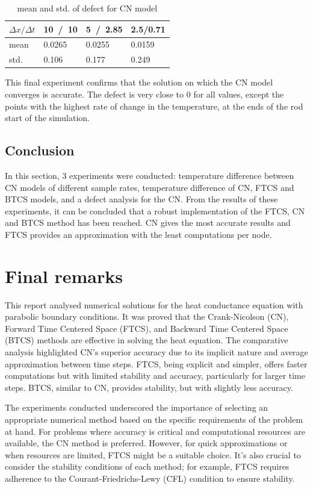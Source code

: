 \documentclass[a4paper]{article} %
\begin{document}
\begin{table}[H]
\centering
\small
\begin{tabular}{ |p{1.2cm}||p{1.2cm}|p{1.2cm}|p{1.2cm}| }
 \hline
 \rowcolor{gray!50}
 $\Delta x / \Delta t$ & 10\ /\ 10 & 5\ /\ 2.85 &  2.5/0.71 \\
 \hline 
 \cellcolor{gray!25} mean & 0.0265 & 0.0255 & 0.0159 \\
 \hline
 \cellcolor{gray!25} std. & 0.106 & 0.177 & 0.249 \\
 \hline
\end{tabular}
\caption{mean and std. of defect for CN model}
\label{table:5}
\end{table}

This final experiment confirms that the solution on which the CN model converges is accurate. The defect is very close to $0$ for all values, except the points with the highest rate of change in the temperature, at the ends of the rod start of the simulation. 
\subsection{Conclusion}

In this section, 3 experiments were conducted: temperature difference between CN models of different sample rates, temperature difference of CN, FTCS and BTCS models, and a defect analysis for the CN. From the results of these experiments, it can be concluded that a robust implementation of the FTCS, CN and BTCS method has been reached. CN gives the most accurate results and FTCS provides an approximation with the least computations per node.


\section{Final remarks}
This report analysed numerical solutions for the heat conductance equation with parabolic boundary conditions. It was proved that the Crank-Nicolson (CN), Forward Time Centered Space (FTCS), and Backward Time Centered Space (BTCS) methods are effective in solving the heat equation. The comparative analysis highlighted CN's superior accuracy due to its implicit nature and average approximation between time steps. FTCS, being explicit and simpler, offers faster computations but with limited stability and accuracy, particularly for larger time steps. BTCS, similar to CN, provides stability, but with slightly less accuracy.

The experiments conducted underscored the importance of selecting an appropriate numerical method based on the specific requirements of the problem at hand. For problems where accuracy is critical and computational resources are available, the CN method is preferred. However, for quick approximations or when resources are limited, FTCS might be a suitable choice. It's also crucial to consider the stability conditions of each method; for example, FTCS requires adherence to the Courant-Friedrichs-Lewy (CFL) condition to ensure stability.
\end{document}
